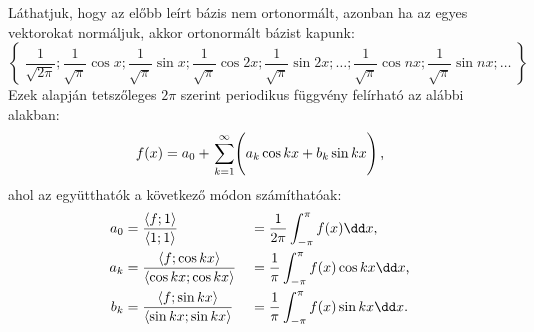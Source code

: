 \documentclass[a4paper, 12pt]{scrartcl}
\begin{document}
\begin{blueBox}
\end{blueBox}

\begin{blueBox}
  Láthatjuk, hogy az előbb leírt bázis nem ortonormált, azonban ha az egyes
  vektorokat normáljuk, akkor ortonormált bázist kapunk:
  $$
    \left\{\;
    \frac{1}{\sqrt{2\pi}};
    \frac{1}{\sqrt{\pi}} \cos x; \frac{1}{\sqrt{\pi}} \sin x;
    \frac{1}{\sqrt{\pi}} \cos 2x; \frac{1}{\sqrt{\pi}} \sin 2x;
    \dots;
    \frac{1}{\sqrt{\pi}} \cos nx; \frac{1}{\sqrt{\pi}} \sin nx;
    \dots
    \;\right\}
  $$
  Ezek alapján tetszőleges $2\pi$ szerint periodikus függvény felírható az
  alábbi alakban:
  $$
    f(x) = a_0 + \left.\sum_{k=1}^{\infty} \middle( a_k \cos kx + b_k \sin kx \right)
    \text,
  $$
  ahol az együtthatók a következő módon számíthatóak:
  \begin{alignat*}{9}
    a_0
     & = \frac{\langle f; 1 \rangle}{\langle 1; 1 \rangle}
     & \;=\;
     & \frac{1}{2\pi} \int_{-\pi}^{\pi} f(x) \dd x
    \text,
    \\
    a_k
     & = \frac{\langle f; \cos kx \rangle}{\langle \cos kx; \cos kx \rangle}
     & \;=\;
     & \frac{1}{\pi} \int_{-\pi}^{\pi} f(x) \cos kx \dd x
    \text,
    \\
    b_k
     & = \frac{\langle f; \sin kx \rangle}{\langle \sin kx; \sin kx \rangle}
     & \;=\;
     & \frac{1}{\pi} \int_{-\pi}^{\pi} f(x) \sin kx \dd x
    \text.
  \end{alignat*}
\end{blueBox}
\end{document}
